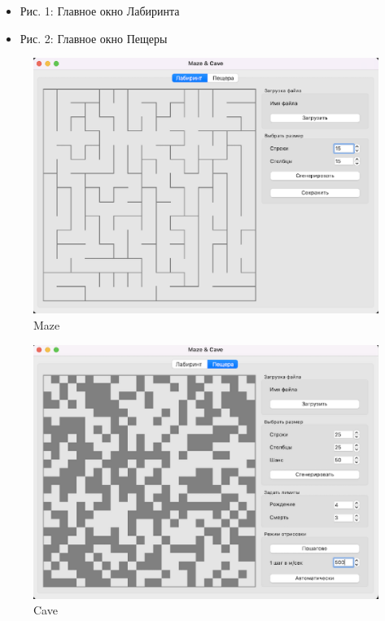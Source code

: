 \documentclass[11pt, letterpaper]{article}
\begin{document}
\begin{itemize}
	\item Рис. 1: Главное окно Лабиринта
	\item Рис. 2: Главное окно Пещеры
\end{itemize}

\begin{figure}[htb]
    \begin{center}
       \leavevmode
       \includegraphics[]{maze.eps}
       \caption{Maze}
    \end{center}
\end{figure}

\begin{figure}[htb]
    \begin{center}
       \leavevmode
       \includegraphics[]{cave.eps}
       \caption{Cave}
    \end{center}
\end{figure}
\end{document}
